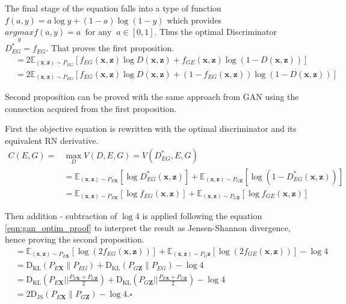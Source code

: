The final stage of the equation falls into a type of function $ f(a,y) = a\log y + (1 -a) \log(1-y)$
\cite{Donahue2017AdversarialFL} which provides $\underset{y}{argmax} f(a,y) = a\ \text{ for any }\ a
\in [0,1]$. Thus the optimal Discriminator $D^*_{EG} = f_{EG}$. That proves the first proposition. 
\begin{align}
    &=2 \mathbb{E}_{(\mathbf{x}, \mathbf{z}) \sim P_{E G}}\left[f_{E G}(\mathbf{x}, \mathbf{z}) \log D(\mathbf{x}, \mathbf{z})+f_{G E}(\mathbf{x}, \mathbf{z}) \log (1-D(\mathbf{x}, \mathbf{z}))\right] \\[5pt]
    &=2 \mathbb{E}_{(\mathbf{x}, \mathbf{z}) \sim P_{E G}}\left[f_{E G}(\mathbf{x}, \mathbf{z}) \log D(\mathbf{x}, \mathbf{z})+\left(1-f_{E G}(\mathbf{x}, \mathbf{z})\right) \log (1-D(\mathbf{x}, \mathbf{z}))\right]
\end{align}

Second proposition can be proved with the same approach from
GAN\cite{Goodfellow:2014:GAN:2969033.2969125} using the connection acquired from the first
proposition. \cite{Donahue2017AdversarialFL}

First the objective equation is rewritten with the optimal discriminator and its equivalent RN
derivative. \cite{Donahue2017AdversarialFL}
\begin{align}
    C(E, G)=&\max _{D} V(D, E, G)=V\left(D_{E G}^{*}, E, G\right) \\[5pt]
    & =\mathbb{E}_{(\mathbf{x}, \mathbf{z}) \sim P_{E \mathbf{X}}}\left[\log D_{E G}^{*}(\mathbf{x}, \mathbf{z})\right]+\mathbb{E}_{(\mathbf{x}, \mathbf{z}) \sim P_{G \mathbf{Z}}}\left[\log \left(1-D_{E G}^{*}(\mathbf{x}, \mathbf{z})\right)\right] \\[5pt]
    & =\mathbb{E}_{(\mathbf{x}, \mathbf{z}) \sim P_{E \mathbf{X}}}\left[\log f_{E G}(\mathbf{x}, \mathbf{z})\right]+\mathbb{E}_{(\mathbf{x}, \mathbf{z}) \sim P_{G \mathbf{Z}}}\left[\log f_{G E}(\mathbf{x}, \mathbf{z})\right]
\end{align}

Then addition - subtraction of $\log4$ is applied following the equation \ref{eqn:gan_optim_proof}
to interpret the result as Jensen-Shannon divergence, hence proving the second proposition.
\begin{align}
    &=\mathbb{E}_{(\mathbf{x}, \mathbf{z}) \sim P_{E \mathbf{X}}}\left[\log \left(2 f_{E G}(\mathbf{x}, \mathbf{z})\right)\right]+\mathbb{E}_{(\mathbf{x}, \mathbf{z}) \sim P_{G} \mathbf{z}}\left[\log \left(2 f_{G E}(\mathbf{x}, \mathbf{z})\right)\right]-\log 4 \\[5pt]
    & =\mathrm{D}_{\mathrm{KL}}\left(P_{E \mathbf{X}} \| P_{E G}\right)+\mathrm{D}_{\mathrm{KL}}\left(P_{G \mathbf{Z}} \| P_{E G}\right)-\log 4 \\[5pt]
    &=\mathrm{D}_{\mathrm{KL}}\left(P_{E \mathbf{X}}| | \frac{P_{E \mathbf{X}}+P_{G \mathbf{Z}}}{2}\right)+\mathrm{D}_{\mathrm{KL}}\left(P_{G \mathbf{Z}}| | \frac{P_{E \mathbf{X}}+P_{G \mathbf{Z}}}{2}\right)-\log 4 \\[5pt]
    & =2 \mathrm{D}_{\mathrm{JS}}\left(P_{E \mathbf{X}} \| P_{G \mathbf{Z}}\right)-\log 4 . \square
\end{align}

